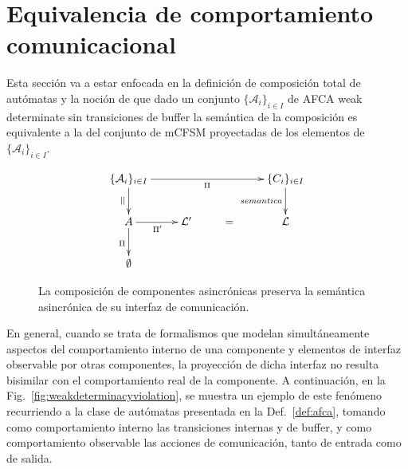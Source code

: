 \chapter{Equivalencia de comportamiento comunicacional}
\label{resultados}
Esta sección va a estar enfocada en la definición de composición total de autómatas y la noción de que dado un conjunto $\{ \mathcal{A}_i\}_{i \in I}$ de AFCA weak determinate sin transiciones de buffer la semántica de la composición es equivalente a la del conjunto de mCFSM proyectadas de los elementos de $\{ \mathcal{A}_i\}_{i \in I}$. 

\begin{figure}[ht]
$$
\xymatrix{   
	\{\mathcal{A}_i\}_{i \in I} \ar[rrr]_{\Pi} \ar[d]_{||} & & & \{C_i\}_{i \in I}  \ar[d]_{semantica}  \\
	  {A} \ar[r]_{\Pi'} \ar[d]_{\Pi} & \mathcal{L}' & = & {\mathcal{L}}  \\
	  \emptyset
}
$$
\caption{La composición de componentes asincrónicas preserva la semántica asincrónica de su interfaz de comunicación.}
\label{fig:preservacion}
\end{figure}

En general, cuando se trata de formalismos que modelan simultáneamente aspectos del comportamiento interno de una componente y elementos de interfaz observable por otras componentes, la proyección de dicha interfaz no resulta bisimilar con el comportamiento real de la componente. A continuación, en la Fig.~\ref{fig:weakdeterminacyviolation}, se muestra un ejemplo de este fenómeno recurriendo a la clase de autómatas presentada en la Def.~\ref{def:afca}, tomando como comportamiento interno las transiciones internas y de buffer, y como comportamiento observable las acciones de comunicación, tanto de entrada como de salida.

